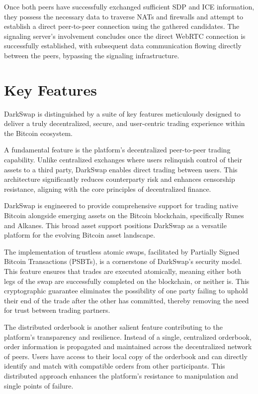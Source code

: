 \documentclass{article}
\begin{document}
Once both peers have successfully exchanged sufficient SDP and ICE information, they possess the necessary data to traverse NATs and firewalls and attempt to establish a direct peer-to-peer connection using the gathered candidates. The signaling server's involvement concludes once the direct WebRTC connection is successfully established, with subsequent data communication flowing directly between the peers, bypassing the signaling infrastructure.

\section{Key Features}
DarkSwap is distinguished by a suite of key features meticulously designed to deliver a truly decentralized, secure, and user-centric trading experience within the Bitcoin ecosystem.

A fundamental feature is the platform's decentralized peer-to-peer trading capability. Unlike centralized exchanges where users relinquish control of their assets to a third party, DarkSwap enables direct trading between users. This architecture significantly reduces counterparty risk and enhances censorship resistance, aligning with the core principles of decentralized finance.

DarkSwap is engineered to provide comprehensive support for trading native Bitcoin alongside emerging assets on the Bitcoin blockchain, specifically Runes and Alkanes. This broad asset support positions DarkSwap as a versatile platform for the evolving Bitcoin asset landscape.

The implementation of trustless atomic swaps, facilitated by Partially Signed Bitcoin Transactions (PSBTs), is a cornerstone of DarkSwap's security model. This feature ensures that trades are executed atomically, meaning either both legs of the swap are successfully completed on the blockchain, or neither is. This cryptographic guarantee eliminates the possibility of one party failing to uphold their end of the trade after the other has committed, thereby removing the need for trust between trading partners.

The distributed orderbook is another salient feature contributing to the platform's transparency and resilience. Instead of a single, centralized orderbook, order information is propagated and maintained across the decentralized network of peers. Users have access to their local copy of the orderbook and can directly identify and match with compatible orders from other participants. This distributed approach enhances the platform's resistance to manipulation and single points of failure.
\end{document}
